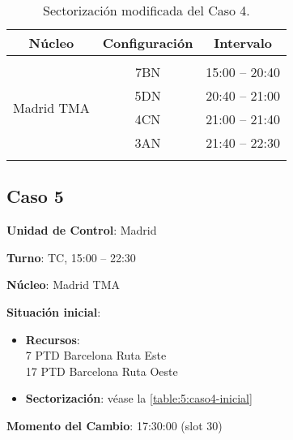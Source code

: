 \begin{table}[h]
	\centering
	\caption{Sectorización modificada del Caso 4.}
	\label{table:D:caso4-modif}
	\begin{tabular}{lcl}
		\hline
		\multicolumn{1}{c}{\textbf{Núcleo}}              & \textbf{Configuración} & \multicolumn{1}{c}{\textbf{Intervalo}} \\ \hline
		& \multicolumn{1}{l}{}   &                                        \\
		\multicolumn{1}{l|}{\multirow{4}{*}{Madrid TMA}} & 7BN                    & 15:00 -- 20:40                         \\
		\multicolumn{1}{l|}{}                            & 5DN                    & 20:40 -- 21:00                         \\
		\multicolumn{1}{l|}{}                            & 4CN                    & 21:00 -- 21:40                         \\
		\multicolumn{1}{l|}{}                            & 3AN                    & 21:40 -- 22:30                         \\
		\multicolumn{1}{c}{}                             &                        & \multicolumn{1}{c}{}                   \\ \hline
	\end{tabular}
\end{table}

\subsection{Caso 5}

\textbf{Unidad de Control}: Madrid

\textbf{Turno}: TC, 15:00 -- 22:30

\textbf{Núcleo}: Madrid TMA

\textbf{Situación inicial}:
\begin{itemize}[label={}]
	
	\item \textbf{Recursos}: \\
	7 PTD Barcelona Ruta Este \\
	17 PTD Barcelona Ruta Oeste
	
	
	\item \textbf{Sectorización}: véase la \autoref{table:5:caso4-inicial}

\end{itemize}

\textbf{Momento del Cambio}: 17:30:00 (slot 30)

